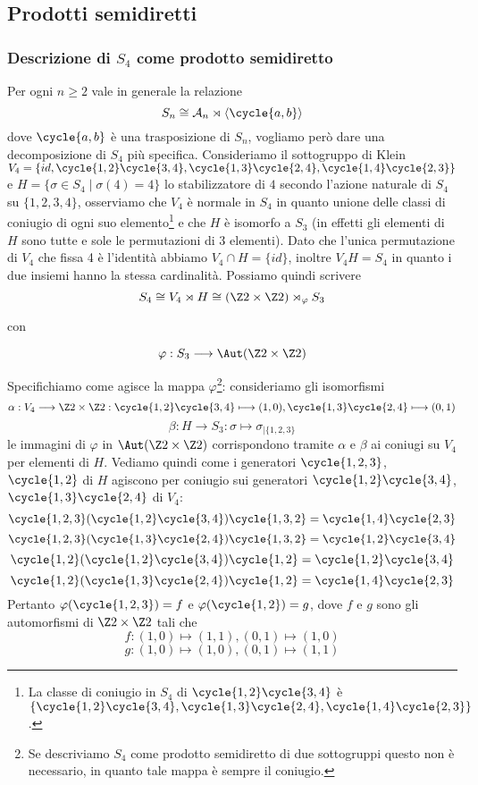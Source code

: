 \documentclass[11pt]{scrartcl}
\begin{document}
\newpage

\subsection{Prodotti semidiretti}

\subsubsection{Descrizione di $S_4$ come prodotto semidiretto}

Per ogni $n \geq 2$ vale in generale la relazione 
\[
    S_n \cong \mathcal{A}_n \rtimes \langle\cycle{a, b}\rangle
\]
dove $\cycle{a, b}$ è una trasposizione di $S_n$, vogliamo però dare una
decomposizione di $S_4$ più specifica. \newline
Consideriamo il sottogruppo di Klein $V_4 = \{id, \cycle{1, 2}\cycle{3, 4}, \cycle{1, 3}\cycle{2, 4},
\cycle{1, 4}\cycle{2, 3}\}$ e $H = \{\sigma \in S_4\mid \sigma(4) = 4\}$ lo 
stabilizzatore di $4$ secondo l'azione naturale di $S_4$ su $\{1, 2, 3, 4\}$,
osserviamo che $V_4$ è normale in $S_4$ in quanto
unione delle classi di coniugio di ogni suo elemento\footnote{
    La classe di coniugio in $S_4$ di $\cycle{1, 2}\cycle{3, 4}$ è 
    $\{\cycle{1, 2}\cycle{3, 4}, \cycle{1, 3}\cycle{2, 4}, \cycle{1, 4}\cycle{2, 3}\}$.
}
e che $H$ è isomorfo a $S_3$ (in effetti gli elementi di $H$ sono tutte e 
sole le permutazioni di 3 elementi). Dato che l'unica permutazione di $V_4$
che fissa 4 è l'identità abbiamo $V_4 \cap H = \{id\}$, inoltre $V_4H = S_4$
in quanto i due insiemi hanno la stessa cardinalità. Possiamo quindi scrivere
\[
    S_4 \cong V_4 \rtimes H \cong (\Z2 \times \Z2) \rtimes_{\varphi} S_3
\]

con

\[
    \varphi: S_3 \longrightarrow \Aut(\Z2\times\Z2)
\]

Specifichiamo come agisce la mappa $\varphi$\footnote{Se descriviamo $S_4$ 
    come prodotto semidiretto di due sottogruppi questo non è 
    necessario, in quanto tale mappa è sempre il coniugio.
}:
consideriamo gli isomorfismi
\[
    \alpha: V_4\longrightarrow \Z2\times\Z2: \cycle{1, 2}\cycle{3, 4}\longmapsto (1, 0),
    \cycle{1, 3}\cycle{2, 4} \longmapsto (0, 1)
\]
\[
    \beta: H \longrightarrow S_3: \sigma \longmapsto \sigma_{\mid\{1, 2, 3\}}
\]
le immagini di $\varphi$ in $\Aut(\Z2\times\Z2)$ corrispondono tramite $\alpha$
e $\beta$ ai coniugi su $V_4$ per elementi di $H$. Vediamo quindi come
i generatori $\cycle{1, 2, 3}$, $\cycle{1, 2}$ di $H$ agiscono per coniugio
sui generatori $\cycle{1, 2}\cycle{3, 4}$, $\cycle{1, 3}\cycle{2, 4}$ di $V_4$:
\[
    \cycle{1, 2, 3}(\cycle{1, 2}\cycle{3, 4})\cycle{1, 3, 2} = \cycle{1, 4}\cycle{2, 3}
\]
\[
    \cycle{1, 2, 3}(\cycle{1, 3}\cycle{2, 4})\cycle{1, 3, 2} = \cycle{1, 2}\cycle{3, 4}
\]
\[
    \cycle{1, 2}(\cycle{1, 2}\cycle{3, 4})\cycle{1, 2} = \cycle{1, 2}\cycle{3, 4}
\]
\[
    \cycle{1, 2}(\cycle{1, 3}\cycle{2, 4})\cycle{1, 2} = \cycle{1, 4}\cycle{2, 3}
\]
Pertanto $\varphi(\cycle{1, 2, 3}) = f$ e $\varphi(\cycle{1, 2}) = g$,
dove $f$ e $g$ sono gli automorfismi di $\Z2\times\Z2$ tali che
\[
    f: (1, 0)\longmapsto (1, 1), (0, 1) \longmapsto (1, 0)
\]
\[
    g: (1, 0)\longmapsto (1, 0), (0, 1) \longmapsto (1, 1)
\]
\end{document}

